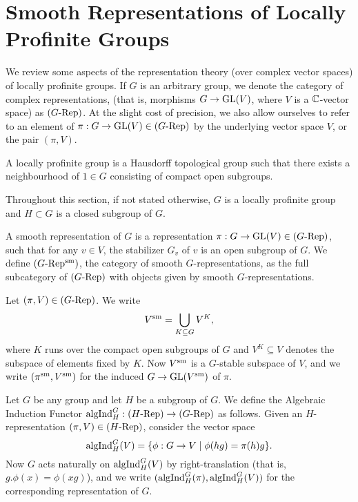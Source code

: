 \documentclass[../main.tex]{subfiles}
\begin{document}
\section{Smooth Representations of Locally Profinite Groups}
We review some aspects of the representation theory (over complex vector spaces)
of locally profinite groups. 
If $G$ is an arbitrary group, we denote the category of complex representations,
(that is, morphisms $G \to \operatorname{GL}(V)$, where $V$ is a $\mathbb{C}$-vector space) as
${({G}\text-\allowbreak\mathrm{Rep})}$. At the slight cost of precision, we also allow ourselves to refer to
an element of $\pi: G \to \operatorname{GL}(V) \in {({G}\text-\allowbreak\mathrm{Rep})}$ by the underlying vector space
$V$, or the pair $(\pi, V)$. 

\begin{defi}
  A locally profinite group is a Hausdorff topological group such that there exists 
  a neighbourhood of $1 \in G$ consisting of compact open subgroups.
\end{defi}
Throughout this section, if not stated otherwise, $G$ is a locally profinite
group and $H \subset G$ is a closed subgroup of $G$.

\begin{defi}
  A smooth representation of $G$ is a
  representation $\pi: G \to \operatorname{GL}(V) \in {({G}\text-\allowbreak\mathrm{Rep})}$,
  such that for any $v \in V$, the stabilizer $G_v$ of $v$ is an open subgroup
  of $G$. We define ${({G}\text-\allowbreak\mathrm{Rep^{\mathrm{sm}}})}$, the category of smooth $G$-representations, as
  the full subcategory of ${({G}\text-\allowbreak\mathrm{Rep})}$ with objects given by smooth
  $G$-representations.
\end{defi}

\begin{defi}
  Let $(\pi,V) \in {({G}\text-\allowbreak\mathrm{Rep})}$. We write 
  \begin{equation*}
    V^{\mathrm{sm}} = \bigcup_{K \subseteq G} V^K,
  \end{equation*}
  where $K$ runs over the compact open subgroups of $G$ and $V^K \subseteq V$
  denotes the subspace of elements fixed by $K$. 
  Now $V^{\mathrm{sm}}$ is a $G$-stable subspace of $V$, and we write $(\pi^{\mathrm{sm}}, V^{\mathrm{sm}})$ 
  for the induced $G \to \operatorname{GL}(V^{\mathrm{sm}})$ of $\pi$.
\end{defi}

\begin{defi}
  Let $G$ be any group and let $H$ be a subgroup of $G$. We define the Algebraic
  Induction Functor $\mathrm{algInd}_H^G: {({H}\text-\allowbreak\mathrm{Rep})} \to {({G}\text-\allowbreak\mathrm{Rep})}$ as follows. Given an
  $H$-representation $(\pi, V)\in {({H}\text-\allowbreak\mathrm{Rep})}$, consider the vector space
  \begin{equation*}
    \mathrm{algInd}_H^G(V) = \{\phi: G \to V \mid \phi(hg) = \pi(h) g\}.
  \end{equation*}
  Now $G$ acts naturally on $\mathrm{algInd}_H^G(V)$ by right-translation (that is, 
  $g.\phi(x) = \phi(xg)$), and we write
  $(\mathrm{algInd}_H^G(\pi),\mathrm{algInd}_H^G(V))$ for the corresponding representation of $G$.
\end{defi}
\end{document}
